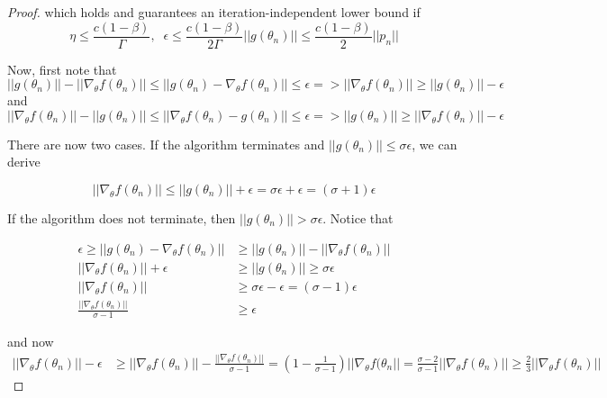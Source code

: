 \documentclass{article}
\begin{document}
\begin{proof}
which holds and guarantees an iteration-independent lower bound if 
\begin{equation}
    \eta \leq \frac{c(1-\beta)}{\Gamma}, \;\; \epsilon \leq \frac{c(1-\beta)}{2\Gamma}||g(\theta_n)|| \leq \frac{c(1-\beta)}{2}||p_n||
\end{equation}

Now, first note that
\begin{equation}
||g(\theta_n)|| - ||\nabla_\theta f(\theta_n)|| \leq ||g(\theta_n) - \nabla_\theta f(\theta_n)|| \leq \epsilon => ||\nabla_\theta f(\theta_n)|| \geq ||g(\theta_n)|| - \epsilon
\end{equation} and
\begin{equation}
||\nabla_\theta f(\theta_n)||-||g(\theta_n)|| \leq ||\nabla_\theta f(\theta_n)-g(\theta_n)|| \leq \epsilon => ||g(\theta_n)|| \geq ||\nabla_\theta f(\theta_n)|| - \epsilon
\end{equation}

There are now two cases. If the algorithm terminates and $||g(\theta_n)|| \leq \sigma \epsilon$, we can derive 

\begin{equation}
    ||\nabla_\theta f(\theta_n)|| \leq ||g(\theta_n)|| + \epsilon = \sigma\epsilon+\epsilon = (\sigma+1)\epsilon
\end{equation}


If the algorithm does not terminate, then $||g(\theta_n)|| > \sigma \epsilon$. Notice that 

\begin{align}
    \epsilon \geq ||g(\theta_n) - \nabla_\theta f(\theta_n)|| &\geq ||g(\theta_n)|| - ||\nabla_\theta f(\theta_n)|| \\
    ||\nabla_\theta f(\theta_n)|| + \epsilon &\geq ||g(\theta_n)|| \geq \sigma \epsilon \\
    ||\nabla_\theta f(\theta_n)|| &\geq \sigma \epsilon - \epsilon = (\sigma - 1)\epsilon \\
    \frac{||\nabla_\theta f(\theta_n)||}{\sigma-1} &\geq \epsilon
\end{align}

and now 
\begin{align}
    ||\nabla_\theta f(\theta_n)|| - \epsilon
    &\geq  ||\nabla_\theta f(\theta_n)|| - \frac{||\nabla_\theta f(\theta_n)||}{\sigma-1} = \left(1-\frac{1}{\sigma-1}\right)||\nabla_\theta f(\theta_n|| = \frac{\sigma-2}{\sigma-1}||\nabla_\theta f(\theta_n)|| \geq \frac{2}{3}||\nabla_\theta f(\theta_n)||
\end{align}


\end{proof}
\end{document}
